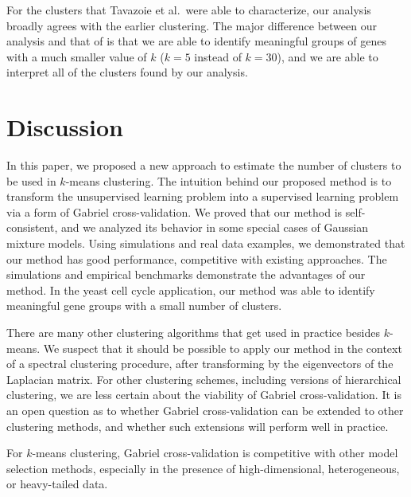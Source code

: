 \documentclass[12pt]{article}
\begin{document}
For the clusters that Tavazoie et al.\ were able to characterize, our analysis
broadly agrees with the earlier clustering. The major difference between our
analysis and that of \citet{tavazoie1999systematic} is that we are able to
identify meaningful groups of genes with a much smaller value of $k$ ($k = 5$
instead of $k = 30$), and we are able to interpret all of the clusters
found by our analysis.




\section{Discussion}
\label{sec:discussion}


In this paper, we proposed a new approach to estimate the number of clusters
to be used in $k$-means clustering. The intuition behind our proposed method
is to transform the unsupervised learning problem into a supervised learning
problem via a form of Gabriel cross-validation.  We proved that our method is
self-consistent, and we analyzed its behavior in some special cases of
Gaussian mixture models.  Using simulations and real data examples, we
demonstrated that our method has good performance, competitive with existing
approaches. The simulations and empirical benchmarks demonstrate the
advantages of our method. In the yeast cell cycle application, our method
was able to identify meaningful gene groups with a small number of clusters.


There are many other clustering algorithms that get used in practice besides
$k$-means. We suspect that it should be possible to apply our method in the
context of a spectral clustering procedure, after transforming by the
eigenvectors of the Laplacian matrix. For other clustering schemes, including
versions of hierarchical clustering, we are less certain about the viability
of Gabriel cross-validation.  It is an open question as to whether Gabriel
cross-validation can be extended to other clustering methods, and whether such
extensions will perform well in practice.


For $k$-means clustering, Gabriel cross-validation is competitive with
other model selection methods, especially in the presence of high-dimensional,
heterogeneous, or heavy-tailed data.
\end{document}
